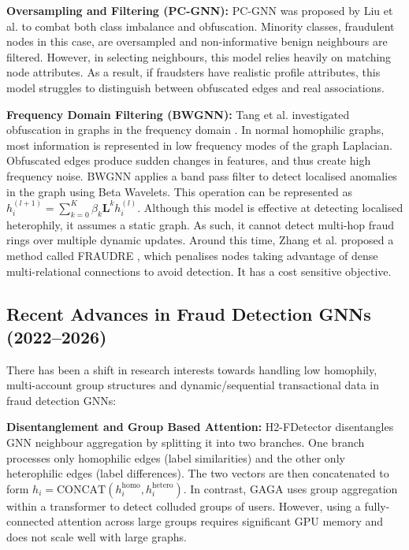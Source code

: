 \textbf{Oversampling and Filtering (PC-GNN):} PC-GNN \cite{liu2021pick} was proposed by Liu et al. to combat both class imbalance and obfuscation. Minority classes, fraudulent nodes in this case, are oversampled and non-informative benign neighbours are filtered. However, in selecting neighbours, this model relies heavily on matching node attributes. As a result, if fraudsters have realistic profile attributes, this model struggles to distinguish between obfuscated edges and real associations.

\textbf{Frequency Domain Filtering (BWGNN):} Tang et al. investigated obfuscation in graphs in the frequency domain \cite{tang2021rethinking}. In normal homophilic graphs, most information is represented in low frequency modes of the graph Laplacian. Obfuscated edges produce sudden changes in features, and thus create high frequency noise. BWGNN applies a band pass filter to detect localised anomalies in the graph using Beta Wavelets. This operation can be represented as $h_i^{(l+1)} = \sum_{k=0}^K \beta_k \mathbf{L}^k h_i^{(l)}$. Although this model is effective at detecting localised heterophily, it assumes a static graph. As such, it cannot detect multi-hop fraud rings over multiple dynamic updates. Around this time, Zhang et al. proposed a method called FRAUDRE \cite{zhang2021fraudre}, which penalises nodes taking advantage of dense multi-relational connections to avoid detection. It has a cost sensitive objective.

\subsection{Recent Advances in Fraud Detection GNNs (2022--2026)}
There has been a shift in research interests towards handling low homophily, multi-account group structures and dynamic/sequential transactional data in fraud detection GNNs:

\textbf{Disentanglement and Group Based Attention:} H2-FDetector \cite{shi2022h2} disentangles GNN neighbour aggregation by splitting it into two branches. One branch processes only homophilic edges (label similarities) and the other only heterophilic edges (label differences). The two vectors are then concatenated to form $h_i = \text{CONCAT}\left(h_i^{\text{homo}}, h_i^{\text{hetero}}\right)$. In contrast, GAGA \cite{wang2023gaga} uses group aggregation within a transformer to detect colluded groups of users. However, using a fully-connected attention across large groups requires significant GPU memory and does not scale well with large graphs.

